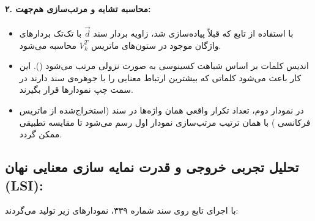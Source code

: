 \documentclass{article}
\begin{document}
    \paragraph{۲. محاسبه تشابه و مرتب‌سازی هم‌جهت:}
    \begin{itemize}
        \item با استفاده از تابع  که قبلاً پیاده‌سازی شد، زاویه بردار سند $\vec{d}$ با تک‌تک بردارهای واژگان موجود در ستون‌های ماتریس $V_k^T$ محاسبه می‌شود.
        \item اندیس کلمات بر اساس شباهت کسینوسی به صورت نزولی مرتب می‌شود (). این کار باعث می‌شود کلماتی که بیشترین ارتباط معنایی را با جوهره‌ی سند دارند در سمت چپ نمودارها قرار بگیرند.
        \item در نمودار دوم، تعداد تکرار واقعی همان واژه‌ها در سند (استخراج‌شده از ماتریس فرکانسی ) با همان ترتیب مرتب‌سازی نمودار اول رسم می‌شود تا مقایسه تطبیقی ممکن گردد.
    \end{itemize}

    \subsection*{تحلیل تجربی خروجی و قدرت نمایه سازی معنایی نهان (LSI):}
    با اجرای تابع روی سند شماره ۳۳۹، نمودارهای زیر تولید می‌گردند:
\end{document}
